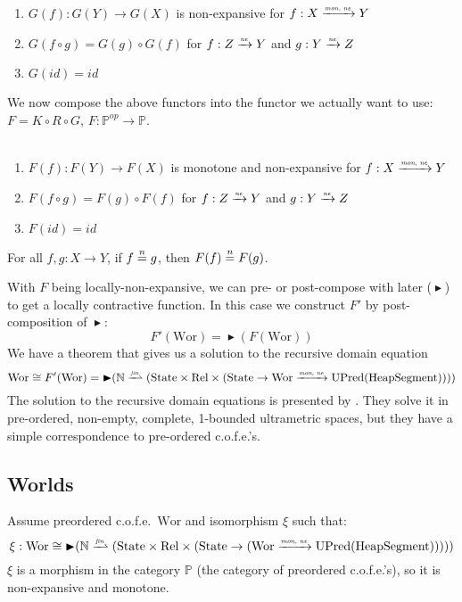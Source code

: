\documentclass{article}
\newcommand{\forcenewline}{$\phantom{v}$\\}
\newcommand{\finparfun}{\xrightharpoonup{\textit{\tiny{fin}}}}
\newcommand{\monnefun}{\xrightarrow{\textit{\tiny{mon, ne}}}}
\newcommand{\nefun}{\xrightarrow{\textit{\tiny{ne}}}}
\newcommand{\fun}{\rightarrow}
\newcommand{\nequal}[1][n]{\stackrel{\tiny{#1}}{=}}
\newcommand{\blater}{\mathop{\blacktriangleright}}
\newcommand{\id}{\var{id}}
\newcommand{\cofe}{c.o.f.e.}
\newcommand{\cofes}{\cofe{}'s}
\newcommand{\CatP}{\mathbb{P}}
\newcommand{\var}[1]{\mathit{#1}}
\newcommand{\plaindom}[1]{\mathrm{#1}}
\newcommand{\HeapSegments}{\plaindom{HeapSegment}}
\newcommand{\nats}{\mathbb{N}}
\newcommand{\Rel}{\plaindom{Rel}}
\newcommand{\States}{\plaindom{State}}
\newcommand{\Wor}{\plaindom{Wor}}
\newcommand{\UPred}[1]{\plaindom{UPred}(#1)}
\begin{document}
\begin{lemma}[$G$ functorial]\forcenewline
\label{lem:G-func}
  \begin{enumerate}
  \item $G(f) : G(Y) \rightarrow G(X)$ is non-expansive for $f : X \monnefun Y$
  \item $G(f \circ g) = G(g) \circ G(f)$ for $f : Z \nefun Y$ and $g : Y \nefun Z$
  \item $G(\id) = \id$
  \end{enumerate}
\end{lemma}
We now compose the above functors into the functor we actually want to use: $F = K \circ R \circ G$, $F : \CatP^{\var{op}} \rightarrow \CatP$.
\begin{lemma}[$F$ functorial]\forcenewline
\label{lem:F-func}
  \begin{enumerate}
  \item $F(f) : F(Y) \rightarrow F(X)$ is monotone and non-expansive for $f : X \monnefun Y$
  \item $F(f \circ g) = F(g) \circ F(f)$ for $f : Z \nefun Y$ and $g : Y \nefun Z$\
  \item $F(\id) = \id$
  \end{enumerate}
\end{lemma}

\begin{lemma}
\label{lem:F-loc-ne}
For all $f, g : X \fun Y$, if $f \nequal g$, then $F(f) \nequal F(g)$.
\end{lemma}
With $F$ being locally-non-expansive, we can pre- or post-compose with later ($\blater$) to get a locally contractive function. In this case we construct $F'$ by post-composition of $\blater$:
\[
  F'(\Wor) = \blater (F(\Wor))
\]
We have a theorem that gives us a solution to the recursive domain equation
\[
  \Wor \cong F'(\Wor) = \blater (\nats \finparfun (\States \times \Rel \times (\States \fun \Wor \monnefun \UPred{\HeapSegments} )))
\]
The solution to the recursive domain equations is presented by \cite{Birkedal:2010:TCS:411:4102-4122}. They solve it in pre-ordered, non-empty, complete, 1-bounded ultrametric spaces, but they have a simple correspondence to pre-ordered \cofes{}.

\subsection{Worlds}
\label{subsec:worlds}
Assume preordered \cofe{}\ $\Wor$ and isomorphism $\xi$ such that:
\[
  \xi : \Wor \cong \blater (\nats \finparfun (\States \times \Rel \times (\States \fun (\Wor \monnefun \UPred{\HeapSegments}))))
\]
$\xi$ is a morphism in the category $\CatP$ (the category of preordered \cofes{}), so it is non-expansive and monotone.
\end{document}
